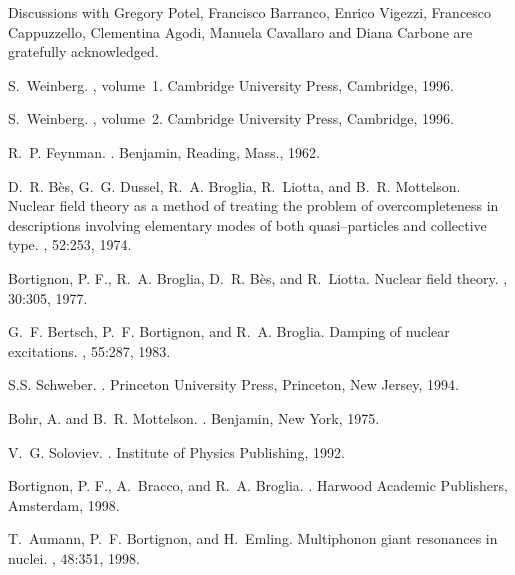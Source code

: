 \documentclass[a4paper,11pt]{article}
\numberwithin{equation}{section}
\numberwithin{figure}{section}
\numberwithin{table}{section}
\begin{document}
 
 Discussions with Gregory Potel, Francisco Barranco, Enrico Vigezzi, Francesco Cappuzzello, Clementina Agodi, Manuela Cavallaro and Diana Carbone   are gratefully acknowledged. 

%
%
\begin{thebibliography}{10}
	
	S.~Weinberg.
	, volume~1.
	\newblock Cambridge University Press, Cambridge, 1996.
	
	S.~Weinberg.
	, volume~2.
	\newblock Cambridge University Press, Cambridge, 1996.
	
	R.~P. Feynman.
	.
	\newblock Benjamin, Reading, Mass., 1962.
	
	D.~R. B\`{e}s, G.~G. Dussel, R.~A. Broglia, R.~Liotta, and B.~R. Mottelson.
	\newblock Nuclear field theory as a method of treating the problem of
	overcompleteness in descriptions involving elementary modes of both
	quasi--particles and collective type.
	, 52:253, 1974.
	
	{Bortignon, P. F.}, R.~A. Broglia, D.~R. B{\`{e}}s, and R.~Liotta.
	\newblock Nuclear field theory.
	, 30:305, 1977.
	
	G.~F. Bertsch, P.~F. Bortignon, and R.~A. Broglia.
	\newblock Damping of nuclear excitations.
	, 55:287, 1983.
	
	S.S. Schweber.
	.
	\newblock Princeton University Press, Princeton, New Jersey, 1994.
	
	{Bohr, A.} and B.~R. Mottelson.
	.
	\newblock Benjamin, New York, 1975.
	
	V.~G. Soloviev.
	.
	\newblock Institute of Physics Publishing, 1992.
	
	{Bortignon, P. F.}, A.~Bracco, and R.~A. Broglia.
	.
	\newblock Harwood Academic Publishers, Amsterdam, 1998.
	
	T.~Aumann, P.~F. Bortignon, and H.~Emling.
	\newblock Multiphonon giant resonances in nuclei.
	, 48:351, 1998.
	

\end{thebibliography}
\end{document}
